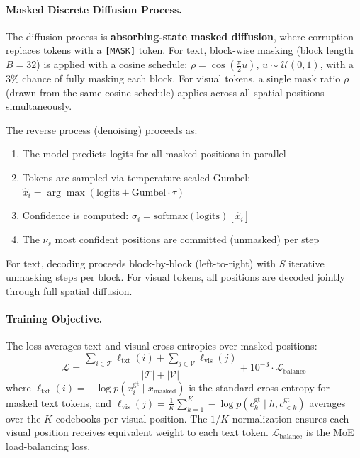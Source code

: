 \documentclass[11pt,a4paper]{article}
\begin{document}
\paragraph{Masked Discrete Diffusion Process.}
The diffusion process is \textbf{absorbing-state masked diffusion}, where corruption replaces tokens with a \texttt{[MASK]} token. For text, block-wise masking (block length $B{=}32$) is applied with a cosine schedule: $\rho = \cos(\frac{\pi}{2} u)$, $u \sim \mathcal{U}(0,1)$, with a 3\% chance of fully masking each block. For visual tokens, a single mask ratio $\rho$ (drawn from the same cosine schedule) applies across all spatial positions simultaneously.

The reverse process (denoising) proceeds as:
\begin{enumerate}
\item The model predicts logits for all masked positions in parallel
\item Tokens are sampled via temperature-scaled Gumbel: $\hat{x}_i = \arg\max(\text{logits} + \text{Gumbel} \cdot \tau)$
\item Confidence is computed: $\sigma_i = \text{softmax}(\text{logits})[\hat{x}_i]$
\item The $\nu_s$ most confident positions are committed (unmasked) per step
\end{enumerate}
For text, decoding proceeds block-by-block (left-to-right) with $S$ iterative unmasking steps per block. For visual tokens, all positions are decoded jointly through full spatial diffusion.

\paragraph{Training Objective.}
The loss averages text and visual cross-entropies over masked positions:
\begin{equation}
\mathcal{L} = \frac{\sum_{i \in \mathcal{T}} \ell_{\text{txt}}(i) + \sum_{j \in \mathcal{V}} \ell_{\text{vis}}(j)}{|\mathcal{T}| + |\mathcal{V}|} + 10^{-3} \cdot \mathcal{L}_{\text{balance}}
\end{equation}
where $\ell_{\text{txt}}(i) = -\log p(x_i^{\text{gt}} \mid x_{\text{masked}})$ is the standard cross-entropy for masked text tokens, and $\ell_{\text{vis}}(j) = \frac{1}{K} \sum_{k=1}^{K} -\log p(c_k^{\text{gt}} \mid h, c_{<k}^{\text{gt}})$ averages over the $K$ codebooks per visual position. The $1/K$ normalization ensures each visual position receives equivalent weight to each text token. $\mathcal{L}_{\text{balance}}$ is the MoE load-balancing loss.
\end{document}
